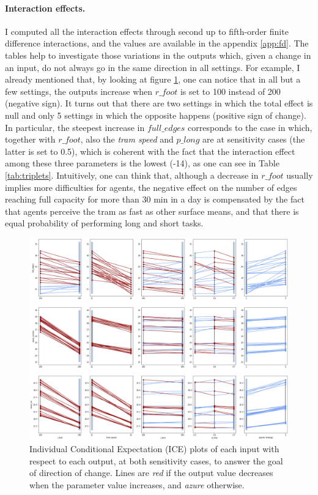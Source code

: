 \paragraph{Interaction effects.} 
I computed all the interaction effects through second up to fifth-order finite difference interactions, and the values are available in the appendix \ref{app:fd}. The tables help to investigate those variations in the outputs which, given a change in an input, do not always go in the same direction in all settings. For example, I already mentioned that, by looking at figure \ref{fig:ICE}, one can notice that in all but a few settings, the outputs increase when $r\_foot$ is set to 100 instead of 200 (negative sign). It turns out that there are two settings in which the total effect is null and only 5 settings in which the opposite happens (positive sign of change). In particular, the steepest increase in $full\_edges$ corresponds to the case in which, together with $r\_foot$, also the \textit{tram speed} and $p\_long$ are at sensitivity cases (the latter is set to 0.5), which is coherent with the fact that the interaction effect among these three parameters is the lowest (-14), as one can see in Table \ref{tab:triplets}. Intuitively, one can think that, although a decrease in $r\_foot$ usually implies more difficulties for agents, the negative effect on the number of edges reaching full capacity for more than 30 min in a day is compensated by the fact that agents perceive the tram as fast as other surface means, and that there is equal probability of performing long and short tasks.

\begin{landscape}
\begin{figure}
    \centering
    \includegraphics[height = \textheight]{tex/pics/ICE.png}
    \caption{Individual Conditional Expectation (ICE) plots of each input with respect to each output, at both sensitivity cases, to answer the goal of direction of change. Lines are \textit{red} if the output value decreases when the parameter value increases, and \textit{azure} otherwise.}
    \label{fig:ICE}
\end{figure}
\end{landscape}
